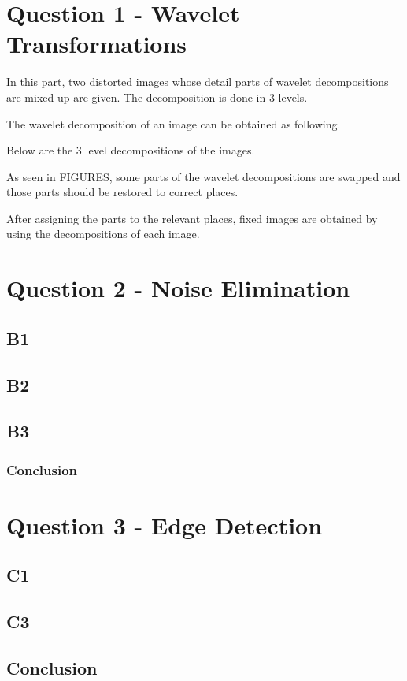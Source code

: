 \documentclass[conference]{IEEEtran}
\begin{document}
\section{Question 1 - Wavelet Transformations}
In this part, two distorted images whose detail parts of wavelet decompositions are mixed up
are given. The decomposition is done in 3 levels.

The wavelet decomposition of an image can be obtained as following.


Below are the 3 level decompositions of the images.



As seen in FIGURES, some parts of the wavelet decompositions are swapped and those parts
should be restored to correct places.

After assigning the parts to the relevant places, fixed images are obtained by using the
decompositions of each image.


\section{Question 2 - Noise Elimination}
\subsection{B1}


\subsection{B2}

\subsection{B3}

\subsubsection{Conclusion}


\section{Question 3 - Edge Detection}

\subsection{C1}

\subsection{C3}


\subsection{Conclusion}
\end{document}
